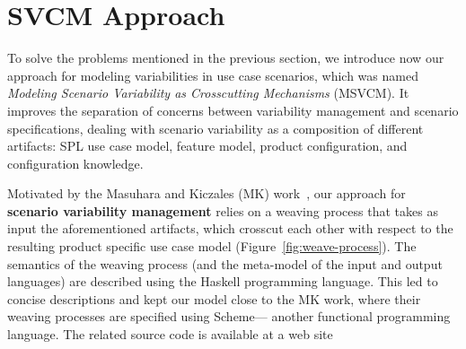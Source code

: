 \documentclass{sig-alt-full}
\begin{document}
%


\section{SVCM Approach}
\label{sec:svmc}

To solve the problems mentioned in the previous section, we introduce now our
approach for modeling variabilities in use case scenarios, which was named
\emph{Modeling Scenario Variability as Crosscutting Mechanisms} (MSVCM). It
improves the separation of concerns between variability management and scenario
specifications, dealing with scenario variability as a composition of different
artifacts: SPL use case model, feature model, product configuration,
and configuration knowledge.

Motivated by the Masuhara and Kiczales (MK) work~\cite{Masuhara:2003aa}, our
approach for \textbf{scenario variability management} relies on a weaving
process that takes as input the aforementioned artifacts, which crosscut
each other with respect to the resulting product specific use case model
(Figure~\ref{fig:weave-process}). The semantics of the weaving process (and the
meta-model of the input and output languages) are described using the Haskell
programming language. This led to concise descriptions and kept our model close
to the MK work, where their weaving processes are specified using Scheme---
another functional programming language. The related source code is available 
at a web site~\cite{SPG:site}
\end{document}
